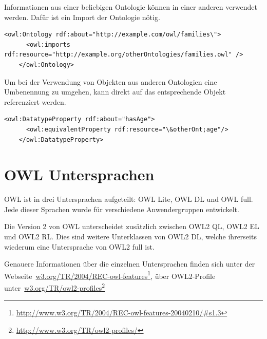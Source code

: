 Informationen aus einer beliebigen Ontologie können in einer anderen verwendet werden. Dafür ist ein Import der Ontologie nötig.

\begin{lstlisting}[caption={Beispiel eines Importes einer Ontologie}]
    <owl:Ontology rdf:about="http://example.com/owl/families\">
      <owl:imports rdf:resource="http://example.org/otherOntologies/families.owl" />
    </owl:Ontology>
\end{lstlisting}


Um bei der Verwendung von Objekten aus anderen Ontologien eine Umbenennung zu umgehen, kann direkt auf das entsprechende Objekt referenziert werden.

\begin{lstlisting}[caption={Beispiel einer Referenzierung auf ein Objekt einer externen Ontologie}]
    <owl:DatatypeProperty rdf:about="hasAge">
      <owl:equivalentProperty rdf:resource="\&otherOnt;age"/>
    </owl:DatatypeProperty>
\end{lstlisting}

\section{OWL Untersprachen}
\label{sec:owl_owl_Untersprachen}
OWL ist in drei Untersprachen aufgeteilt: OWL Lite, OWL DL und OWL full. Jede dieser Sprachen wurde für verschiedene Anwendergruppen entwickelt.

Die Version 2 von OWL unterscheidet zusätzlich zwischen OWL2 QL, OWL2 EL und OWL2 RL. Dies sind weitere Unterklassen von OWL2 DL, welche ihrerseits wiederum eine Untersprache von OWL2 full ist.

Genauere Informationen über die einzelnen Untersprachen finden sich unter der Webseite~\href{http://www.w3.org/TR/2004/REC-owl-features-20040210/\#s1.3}{w3.org/TR/2004/REC-owl-features}\footnote{\url{http://www.w3.org/TR/2004/REC-owl-features-20040210/\#s1.3}}, über OWL2-Profile unter~\href{http://www.w3.org/TR/owl2-profiles/}{w3.org/TR/owl2-profiles}\footnote{\url{http://www.w3.org/TR/owl2-profiles/}}

